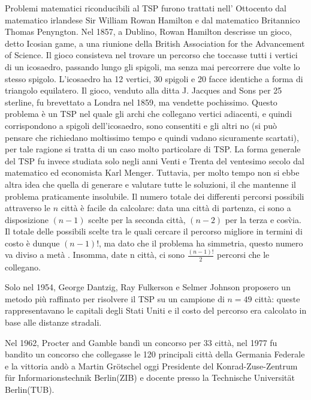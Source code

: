 \documentclass[11pt]{article}
\begin{document}
Problemi matematici riconducibili al TSP furono trattati nell' Ottocento dal matematico irlandese Sir William Rowan Hamilton e dal matematico Britannico Thomas Penyngton.  Nel 1857, a Dublino, Rowan Hamilton descrisse un gioco, detto Icosian game, a una riunione della British Association for the Advancement of Science. Il gioco consisteva nel trovare un percorso che toccasse tutti i vertici di un icosaedro, passando lungo gli spigoli, ma senza mai percorrere due volte lo stesso spigolo. L'icosaedro ha 12 vertici, 30 spigoli e 20 facce identiche a forma di triangolo equilatero.
Il gioco, venduto alla ditta J. Jacques and Sons per 25 sterline, fu brevettato a Londra nel 1859, ma vendette pochissimo. Questo problema \`e un TSP nel quale gli archi che collegano vertici adiacenti, e quindi corrispondono a spigoli dell'icosaedro, sono consentiti e gli altri no (si pu\`o pensare che richiedano moltissimo tempo e quindi vadano sicuramente scartati), per tale ragione si tratta di un caso molto particolare di TSP. La forma generale del TSP fu invece studiata solo negli anni Venti e Trenta del ventesimo secolo dal matematico ed economista Karl Menger. Tuttavia, per molto tempo non si ebbe altra idea che quella di generare e valutare tutte le soluzioni, il che mantenne il problema praticamente insolubile. Il numero totale dei differenti percorsi possibili attraverso le $n$ citt\`a \`e facile da calcolare: data una citt\`a di partenza, ci sono a disposizione $(n - 1)$ scelte per la seconda citt\`a, $(n - 2)$ per la terza e cos\` via. Il totale delle possibili scelte tra le quali cercare il percorso migliore in termini di costo \`e dunque $(n - 1)!$, ma dato che il problema ha simmetria, questo numero va diviso a met\`a . Insomma, date n citt\`a, ci sono $\frac{(n-1)!}{2}$ percorsi che le collegano.

Solo nel 1954, George Dantzig, Ray Fulkerson e Selmer Johnson proposero un metodo pi\`u raffinato per risolvere il TSP  su un campione di $n = 49$ citt\`a: queste rappresentavano le capitali degli Stati Uniti e il costo del percorso era calcolato in base alle distanze stradali. 

Nel 1962, Procter and Gamble bandì un concorso per 33 citt\`a, nel 1977 fu bandito un concorso che collegasse le 120 principali citt\`a della Germania Federale e la vittoria and\`o a Martin Gr\"otschel oggi Presidente del Konrad-Zuse-Zentrum f\"ur Informarionstechnik Berlin(ZIB) e docente presso la Technische Universit\"at Berlin(TUB).
\end{document}
